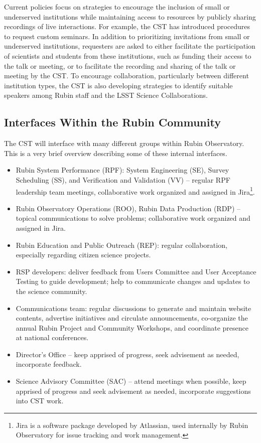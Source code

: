 \documentclass[DM,authoryear,toc]{lsstdoc}
\begin{document}
Current policies focus on strategies to encourage the inclusion of small or underserved institutions while maintaining access to resources by publicly sharing recordings of live interactions. 
For example, the CST has introduced procedures to request custom seminars. In addition to prioritizing invitations from small or underserved institutions, requesters are asked to either facilitate the participation of scientists and students from these institutions, such as funding their access to the talk or meeting, or to facilitate the recording and sharing of the talk or meeting by the CST. 
To encourage collaboration, particularly between different institution types, the CST is also developing strategies to identify suitable speakers among Rubin staff and the LSST Science Collaborations.

\subsection{Interfaces Within the Rubin Community}\label{ssec:mod_interface}

The CST will interface with many different groups within Rubin Observatory. 
This is a very brief overview describing some of these internal interfaces.
\begin{itemize}
\item Rubin System Performance (RPF): System Engineering (SE), Survey Scheduling (SS), and Verification and Validation (VV) -- regular RPF leadership team meetings, collaborative work organized and assigned in Jira\footnote{Jira is a software package developed by Atlassian, used internally by Rubin Observatory for issue tracking and work management.}.
\item Rubin Observatory Operations (ROO), Rubin Data Production (RDP) -- topical communications to solve problems; collaborative work organized and assigned in Jira.
\item Rubin Education and Public Outreach (REP): regular collaboration, especially regarding citizen science projects.
\item RSP developers: deliver feedback from Users Committee and User Acceptance Testing to guide development; help to communicate changes and updates to the science community.
\item Communications team: regular discussions to generate and maintain website contents, advertise initiatives and circulate announcements, co-organize the annual Rubin Project and Community Workshops, and coordinate presence at national conferences.
\item Director's Office -- keep apprised of progress, seek advisement as needed, incorporate feedback.
\item Science Advisory Committee (SAC) -- attend meetings when possible, keep apprised of progress and seek advisement as needed, incorporate suggestions into CST work.
\end{itemize}
\end{document}
